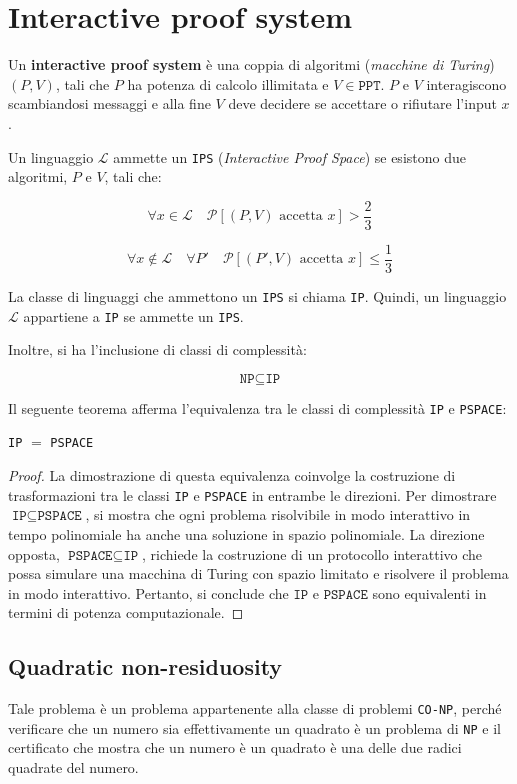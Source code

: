 \section{Interactive proof system}
Un \textbf{interactive proof system} è una coppia di algoritmi (\textit{macchine di Turing}) $(P,V)$, tali 
che $P$ ha potenza di calcolo illimitata e $V \in \texttt{PPT}$. $P$ e $V$ interagiscono scambiandosi 
messaggi e alla fine $V$ deve decidere se accettare o rifiutare l'input $x$.

Un linguaggio $\mathcal{L}$ ammette un \texttt{IPS} (\textit{Interactive Proof Space}) se
esistono due algoritmi, \(P\) e \(V\), tali che:

\[
\forall x \in \mathcal{L} \quad \mathcal{P}[(P,V) \text{ accetta } x] > \frac{2}{3}
\] 

\[
\forall x \notin \mathcal{L} \quad \forall P' \quad \mathcal{P}[(P',V) \text{ accetta } x] \leq \frac{1}{3}
\]

La classe di linguaggi che ammettono un \texttt{IPS} si chiama \texttt{IP}. Quindi, un linguaggio $\mathcal{L}$
appartiene a \texttt{IP} se ammette un \texttt{IPS}.

Inoltre, si ha l'inclusione di classi di complessità:

\[
\texttt{NP} \subseteq \texttt{IP}
\]

Il seguente teorema afferma l'equivalenza tra le classi di complessità
\texttt{IP} e \texttt{PSPACE}:

\begin{theorem}
    \texttt{IP} $=$ \texttt{PSPACE}
\end{theorem}
\begin{proof}
La dimostrazione di questa equivalenza coinvolge la costruzione di trasformazioni tra le classi \texttt{IP} e \texttt{PSPACE}
in entrambe le direzioni.
Per dimostrare \( \texttt{IP} \subseteq \texttt{PSPACE} \), si mostra che ogni problema risolvibile in modo interattivo
in tempo polinomiale ha anche una soluzione in spazio polinomiale.
La direzione opposta, \( \texttt{PSPACE} \subseteq \texttt{IP} \), richiede la costruzione di un protocollo interattivo
che possa simulare una macchina di Turing con spazio limitato e risolvere il problema in modo interattivo.
Pertanto, si conclude che \( \texttt{IP} \) e \( \texttt{PSPACE} \) sono equivalenti in termini di potenza computazionale.
\end{proof}
\subsection{Quadratic non-residuosity}
Tale problema è un problema appartenente alla classe di problemi \texttt{CO-NP}, perché verificare che un numero 
sia effettivamente un quadrato è un problema di \texttt{NP} e il certificato che mostra che un numero è un quadrato è
una delle due radici quadrate del numero.

